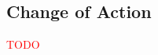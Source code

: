 \documentclass[11pt,a4paper]{article}
\makeatletter
\theoremstyle{plain}
\theoremstyle{definition}
\newcommand{\id}{\mathrm{id}}
\providecommand{\leftsquigarrow}{%
  \mathrel{\mathpalette\reflect@squig\relax}%
}
\newcommand{\reflect@squig}[2]{%
  \reflectbox{$\m@th#1\rightsquigarrow$}%
}
\newcommand{\todo}[1]{\textcolor{red}{\small #1}}
\makeatother
\begin{document}
%
%

\subsection{Change of Action}

\todo{TODO}
\end{document}
